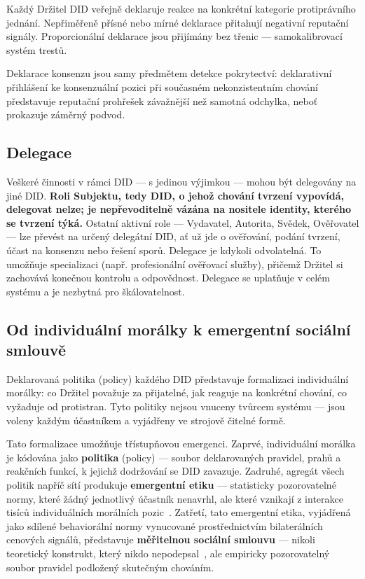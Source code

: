 \documentclass[11pt,a4paper,twocolumn]{article}
\begin{document}
Každý Držitel DID veřejně deklaruje reakce na konkrétní kategorie protiprávního jednání. Nepřiměřeně přísné nebo mírné deklarace přitahují negativní reputační signály. Proporcionální deklarace jsou přijímány bez třenic --- samokalibrovací systém trestů.

Deklarace konsenzu jsou samy předmětem detekce pokrytectví: deklarativní přihlášení ke konsenzuální pozici při současném nekonzistentním chování představuje reputační prohřešek závažnější než samotná odchylka, neboť prokazuje záměrný podvod.

\subsection{Delegace}

Veškeré činnosti v rámci DID --- s jedinou výjimkou --- mohou být delegovány na jiné DID. \textbf{Roli Subjektu, tedy DID, o jehož chování tvrzení vypovídá, delegovat nelze; je nepřevoditelně vázána na nositele identity, kterého se tvrzení týká.} Ostatní aktivní role --- Vydavatel, Autorita, Svědek, Ověřovatel --- lze převést na určený delegátní DID, ať už jde o ověřování, podání tvrzení, účast na konsenzu nebo řešení sporů. Delegace je kdykoli odvolatelná. To umožňuje specializaci (např. profesionální ověřovací služby), přičemž Držitel si zachovává konečnou kontrolu a odpovědnost. Delegace se uplatňuje v celém systému a je nezbytná pro škálovatelnost.

\subsection{Od individuální morálky k emergentní sociální smlouvě}

Deklarovaná politika (policy) každého DID představuje formalizaci individuální morálky: co Držitel považuje za přijatelné, jak reaguje na konkrétní chování, co vyžaduje od protistran. Tyto politiky nejsou vnuceny tvůrcem systému --- jsou voleny každým účastníkem a vyjádřeny ve strojově čitelné formě.

Tato formalizace umožňuje třístupňovou emergenci. Zaprvé, individuální morálka je kódována jako \textbf{politika} (policy) --- soubor deklarovaných pravidel, prahů a reakčních funkcí, k jejichž dodržování se DID zavazuje. Zadruhé, agregát všech politik napříč sítí produkuje \textbf{emergentní etiku} --- statisticky pozorovatelné normy, které žádný jednotlivý účastník nenavrhl, ale které vznikají z interakce tisíců individuálních morálních pozic~\cite{durkheim1893}. Zatřetí, tato emergentní etika, vyjádřená jako sdílené behaviorální normy vynucované prostřednictvím bilaterálních cenových signálů, představuje \textbf{měřitelnou sociální smlouvu} --- nikoli teoretický konstrukt, který nikdo nepodepsal~\cite{rawls1971}, ale empiricky pozorovatelný soubor pravidel podložený skutečným chováním.
\end{document}
